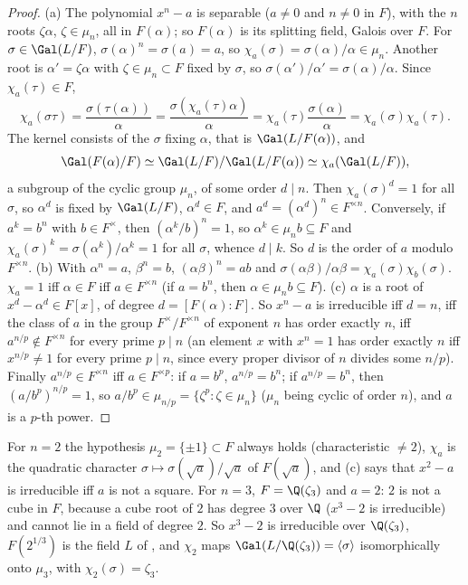 \begin{proof}
(a) The polynomial $x^n-a$ is separable ($a\ne0$ and $n\ne0$ in $F$), with the $n$ roots $\zeta\alpha$, $\zeta\in\mu_n$, all in $F(\alpha)$; so $F(\alpha)$ is its
splitting field, Galois over $F$. For $\sigma\in\Gal(L/F)$, $\sigma(\alpha)^n=\sigma(a)=a$, so $\chi_a(\sigma)=\sigma(\alpha)/\alpha\in\mu_n$. Another root is
$\alpha'=\zeta\alpha$ with $\zeta\in\mu_n\subset F$ fixed by $\sigma$, so $\sigma(\alpha')/\alpha'=\sigma(\alpha)/\alpha$. Since $\chi_a(\tau)\in F$,
\[
\chi_a(\sigma\tau)=\frac{\sigma(\tau(\alpha))}{\alpha}=\frac{\sigma(\chi_a(\tau)\alpha)}{\alpha}=\chi_a(\tau)\frac{\sigma(\alpha)}\alpha=\chi_a(\sigma)\chi_a(\tau).
\]
The kernel consists of the $\sigma$ fixing $\alpha$, that is $\Gal(L/F(\alpha))$, and
\[
\Gal(F(\alpha)/F)\simeq\Gal(L/F)/\Gal(L/F(\alpha))\simeq\chi_a(\Gal(L/F)),
\]
a subgroup of the cyclic group $\mu_n$, of some order $d\mid n$. Then $\chi_a(\sigma)^d=1$ for all $\sigma$, so $\alpha^d$ is fixed by $\Gal(L/F)$, $\alpha^d\in F$, and
$a^d=(\alpha^d)^n\in F^{\times n}$. Conversely, if $a^k=b^n$ with $b\in F^\times$, then $(\alpha^k/b)^n=1$, so $\alpha^k\in\mu_nb\subseteq F$ and $\chi_a(\sigma)^k=
\sigma(\alpha^k)/\alpha^k=1$ for all $\sigma$, whence $d\mid k$. So $d$ is the order of $a$ modulo $F^{\times n}$.
(b) With $\alpha^n=a$, $\beta^n=b$, $(\alpha\beta)^n=ab$ and $\sigma(\alpha\beta)/\alpha\beta=\chi_a(\sigma)\chi_b(\sigma)$. $\chi_a=1$ iff $\alpha\in F$ iff $a\in F^{\times n}$
(if $a=b^n$, then $\alpha\in\mu_nb\subseteq F$).
(c) $\alpha$ is a root of $x^d-\alpha^d\in F[x]$, of degree $d=[F(\alpha):F]$. So $x^n-a$ is irreducible iff $d=n$, iff the class of $a$ in the group $F^\times/F^{\times n}$
of exponent $n$ has order exactly $n$, iff $a^{n/p}\notin F^{\times n}$ for every prime $p\mid n$ (an element $x$ with $x^n=1$ has order exactly $n$ iff $x^{n/p}\ne1$ for every
prime $p\mid n$, since every proper divisor of $n$ divides some $n/p$). Finally $a^{n/p}\in F^{\times n}$ iff $a\in F^{\times p}$: if $a=b^p$,
$a^{n/p}=b^n$; if $a^{n/p}=b^n$, then $(a/b^p)^{n/p}=1$, so $a/b^p\in\mu_{n/p}=\{\zeta^p:\zeta\in\mu_n\}$ ($\mu_n$ being cyclic of order $n$), and $a$ is a $p$-th power.
\end{proof}

For $n=2$ the hypothesis $\mu_2=\{\pm1\}\subset F$ always holds (characteristic $\ne2$), $\chi_a$ is the quadratic character $\sigma\mapsto\sigma(\sqrt a)/\sqrt a$
of $F(\sqrt a)$, and (c) says that $x^2-a$ is irreducible iff $a$ is not a square. For $n=3$, $F=\Q(\zeta_3)$ and $a=2$: $2$ is not a cube in $F$, because a cube
root of $2$ has degree $3$ over $\Q$ ($x^3-2$ is irreducible) and cannot lie in a field of degree $2$. So $x^3-2$ is irreducible over $\Q(\zeta_3)$, $F(2^{1/3})$ is
the field $L$ of , and $\chi_2$ maps $\Gal(L/\Q(\zeta_3))=\langle\sigma\rangle$ isomorphically onto $\mu_3$, with $\chi_2(\sigma)=\zeta_3$.

